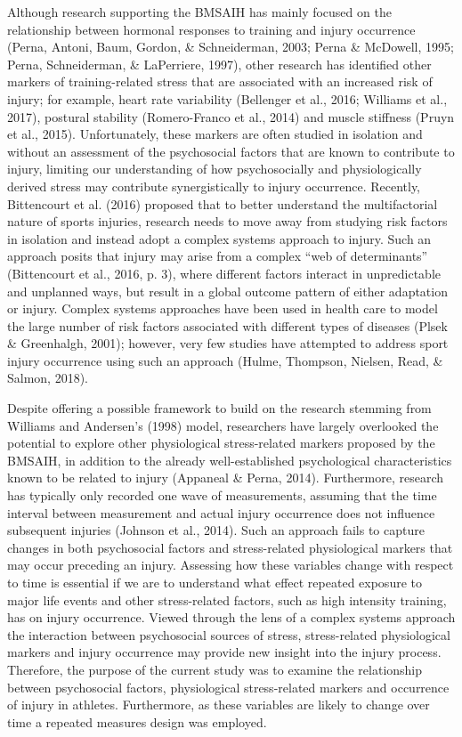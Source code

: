 \documentclass[
  english,
  man,floatsintext]{apa6}
\begin{document}
Although research supporting the BMSAIH has mainly focused on the relationship between hormonal responses to training and injury occurrence (Perna, Antoni, Baum, Gordon, \& Schneiderman, 2003; Perna \& McDowell, 1995; Perna, Schneiderman, \& LaPerriere, 1997), other research has identified other markers of training-related stress that are associated with an increased risk of injury; for example,
heart rate variability (Bellenger et al., 2016; Williams et al., 2017),
postural stability (Romero-Franco et al., 2014)
and muscle stiffness (Pruyn et al., 2015).
Unfortunately, these markers are often studied in isolation and without an assessment of the psychosocial factors that are known to contribute to injury, limiting our understanding of how psychosocially and physiologically derived stress may contribute synergistically to injury occurrence.
Recently, Bittencourt et al. (2016)
proposed that to better understand the multifactorial nature of sports injuries, research needs to move away from studying risk factors in isolation and instead adopt a complex systems approach to injury.
Such an approach posits that injury may arise from a complex \enquote{web of determinants} (Bittencourt et al., 2016, p. 3),
where different factors interact in unpredictable and unplanned ways, but result in a global outcome pattern of either adaptation or injury.
Complex systems approaches have been used in health care to model the large number of risk factors associated with different types of diseases (Plsek \& Greenhalgh, 2001);
however, very few studies have attempted to address sport injury occurrence using such an approach (Hulme, Thompson, Nielsen, Read, \& Salmon, 2018).

Despite offering a possible framework to build on the research stemming from Williams and Andersen's (1998) model, researchers have largely overlooked the potential to explore other physiological stress-related markers proposed by the BMSAIH, in addition to the already well-established psychological characteristics known to be related to injury (Appaneal \& Perna, 2014).
Furthermore, research has typically only recorded one wave of measurements, assuming that the time interval between measurement and actual injury occurrence does not influence subsequent injuries (Johnson et al., 2014).
Such an approach fails to capture changes in both psychosocial factors and stress-related physiological markers that may occur preceding an injury.
Assessing how these variables change with respect to time is essential if we are to understand what effect repeated exposure to major life events and other stress-related factors, such as high intensity training, has on injury occurrence.
Viewed through the lens of a complex systems approach the interaction between psychosocial sources of stress, stress-related physiological markers and injury occurrence may provide new insight into the injury process.
Therefore, the purpose of the current study was to examine the relationship between psychosocial factors, physiological stress-related markers and occurrence of injury in athletes.
Furthermore, as these variables are likely to change over time a repeated measures design was employed.
\end{document}
